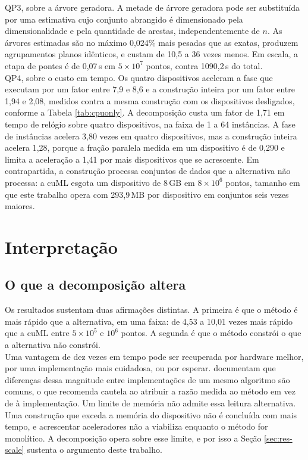 QP3, sobre a árvore geradora. A metade de árvore geradora pode ser substituída por uma estimativa cujo conjunto abrangido é dimensionado pela dimensionalidade e pela quantidade de arestas, independentemente de $n$. As árvores estimadas são no máximo 0,024\% mais pesadas que as exatas, produzem agrupamentos planos idênticos, e custam de 10,5 a 36 vezes menos. Em escala, a etapa de pontes é de 0,07\,s em $5 \times 10^7$ pontos, contra 1090,2\,s do total.\\

QP4, sobre o custo em tempo. Os quatro dispositivos aceleram a fase que executam por um fator entre 7,9 e 8,6 e a construção inteira por um fator entre 1,94 e 2,08, medidos contra a mesma construção com os dispositivos desligados, conforme a Tabela \ref{tab:cpuonly}. A decomposição custa um fator de 1,71 em tempo de relógio sobre quatro dispositivos, na faixa de 1 a 64 instâncias. A fase de instâncias acelera 3,80 vezes em quatro dispositivos, mas a construção inteira acelera 1,28, porque a fração paralela medida em um dispositivo é de 0,290 e limita a aceleração a 1,41 por mais dispositivos que se acrescente. Em contrapartida, a construção processa conjuntos de dados que a alternativa não processa: a cuML esgota um dispositivo de 8\,GB em $8 \times 10^6$ pontos, tamanho em que este trabalho opera com 293,9\,MB por dispositivo em conjuntos seis vezes maiores.\\

\section{Interpretação\label{sec:disc-interpretation}}

\subsection{O que a decomposição altera\label{sec:disc-category}}

Os resultados sustentam duas afirmações distintas. A primeira é que o método é mais rápido que a alternativa, em uma faixa: de 4,53 a 10,01 vezes mais rápido que a cuML entre $5 \times 10^5$ e $10^6$ pontos. A segunda é que o método constrói o que a alternativa não constrói.\\

Uma vantagem de dez vezes em tempo pode ser recuperada por hardware melhor, por uma implementação mais cuidadosa, ou por esperar.  documentam que diferenças dessa magnitude entre implementações de um mesmo algoritmo são comuns, o que recomenda cautela ao atribuir a razão medida ao método em vez de à implementação. Um limite de memória não admite essa leitura alternativa. Uma construção que exceda a memória do dispositivo não é concluída com mais tempo, e acrescentar aceleradores não a viabiliza enquanto o método for monolítico. A decomposição opera sobre esse limite, e por isso a Seção \ref{sec:res-scale} sustenta o argumento deste trabalho.\\

